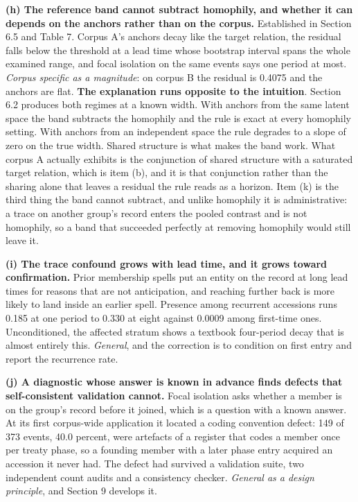 \documentclass[twoside,11pt]{article}
\begin{document}
\textbf{(h) The reference band cannot subtract homophily, and whether it can depends on the anchors rather than on the corpus.} Established in Section 6.5 and Table 7. Corpus A's anchors decay like the target relation, the residual falls below the threshold at a lead time whose bootstrap interval spans the whole examined range, and focal isolation on the same events says one period at most. \emph{Corpus specific as a magnitude}: on corpus B the residual is 0.4075 and the anchors are flat. \textbf{The explanation runs opposite to the intuition}. Section 6.2 produces both regimes at a known width. With anchors from the same latent space the band subtracts the homophily and the rule is exact at every homophily setting. With anchors from an independent space the rule degrades to a slope of zero on the true width. Shared structure is what makes the band work. What corpus A actually exhibits is the conjunction of shared structure with a saturated target relation, which is item (b), and it is that conjunction rather than the sharing alone that leaves a residual the rule reads as a horizon. Item (k) is the third thing the band cannot subtract, and unlike homophily it is administrative: a trace on another group's record enters the pooled contrast and is not homophily, so a band that succeeded perfectly at removing homophily would still leave it.

\textbf{(i) The trace confound grows with lead time, and it grows toward confirmation.} Prior membership spells put an entity on the record at long lead times for reasons that are not anticipation, and reaching further back is more likely to land inside an earlier spell. Presence among recurrent accessions runs 0.185 at one period to 0.330 at eight against 0.0009 among first-time ones. Unconditioned, the affected stratum shows a textbook four-period decay that is almost entirely this. \emph{General}, and the correction is to condition on first entry and report the recurrence rate.

\textbf{(j) A diagnostic whose answer is known in advance finds defects that self-consistent validation cannot.} Focal isolation asks whether a member is on the group's record before it joined, which is a question with a known answer. At its first corpus-wide application it located a coding convention defect: 149 of 373 events, 40.0 percent, were artefacts of a register that codes a member once per treaty phase, so a founding member with a later phase entry acquired an accession it never had. The defect had survived a validation suite, two independent count audits and a consistency checker. \emph{General as a design principle}, and Section 9 develops it.
\end{document}
